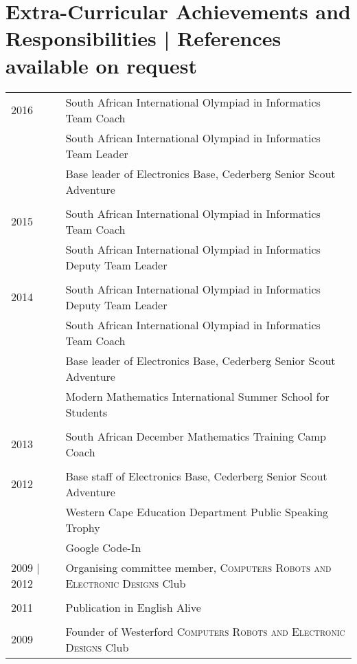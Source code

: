 \section{Extra-Curricular Achievements and Responsibilities \footnotesize | References available on request}

\begin{tabular}{R{3cm}|l}
2016 & South African International Olympiad in Informatics Team Coach\\
& South African International Olympiad in Informatics Team Leader\\
& Base leader of Electronics Base, Cederberg Senior Scout Adventure\\
&\\
2015 & South African International Olympiad in Informatics Team Coach\\
& South African International Olympiad in Informatics Deputy Team Leader\\
&\\
2014& South African International Olympiad in Informatics Deputy Team Leader\\
& South African International Olympiad in Informatics Team Coach\\
& Base leader of Electronics Base, Cederberg Senior Scout Adventure\\
& Modern Mathematics International Summer School for Students\\
&\\
2013 & South African December Mathematics Training Camp Coach\\
&\\
2012 & Base staff of Electronics Base, Cederberg Senior Scout Adventure\\
& Western Cape Education Department Public Speaking Trophy\\
&Google Code-In\\
2009 | 2012 & Organising committee member, \textsc{Computers Robots and Electronic Designs} Club\\
&\\
2011 & Publication in English Alive\\
&\\
2009 & Founder of Westerford \textsc{Computers Robots and Electronic Designs} Club\\
\end{tabular}

